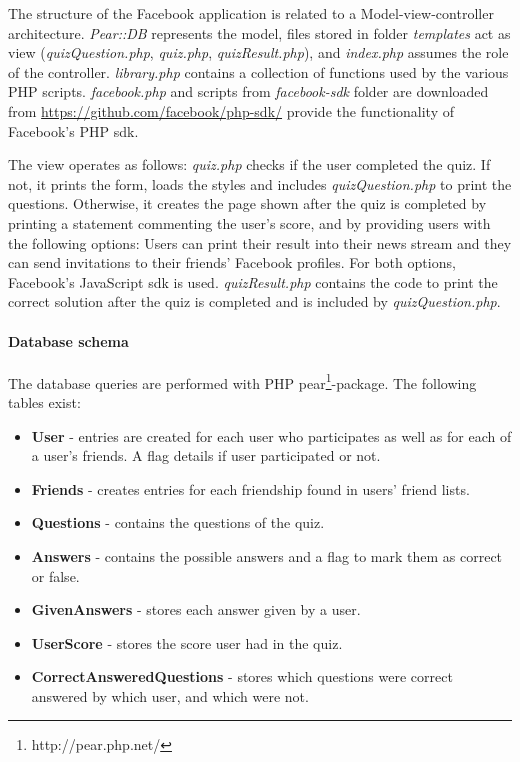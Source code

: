 \documentclass[preprint,12pt]{elsarticle}
\begin{document}
The structure of the Facebook application is related to a
Model-view-controller architecture. \textit{Pear::DB} represents the
model, files stored in folder \textit{templates} act as view
(\textit{quizQuestion.php}, \textit{quiz.php},
\textit{quizResult.php}), and \textit{index.php} assumes the role of
the controller. \textit{library.php} contains a collection of
functions used by the various PHP scripts. \textit{facebook.php} and
scripts from \textit{facebook-sdk} folder are downloaded from
\url{https://github.com/facebook/php-sdk/} provide the functionality
of Facebook's PHP \ac{sdk}.

The view operates as follows: \textit{quiz.php} checks if the user
completed the quiz. If not, it prints the form, loads the styles and
includes \textit{quizQuestion.php} to print the questions. Otherwise, it
creates the page shown after the quiz is completed by printing a
statement commenting the user's score, and by providing users with 
the following options: Users can print their result into their news
stream and they can send invitations to their friends' Facebook
profiles. For both options, Facebook's JavaScript \ac{sdk} is
used. \textit{quizResult.php} contains the code to  
print the correct solution after the quiz is completed and is included
by \textit{quizQuestion.php}. 


\paragraph{Database schema}
\label{sec:database-schema}
The database queries are performed with PHP
pear\footnote{http://pear.php.net/}-package. The following tables exist:
\begin{itemize}
\item \textbf{User} - entries are created for each user who participates as
well as for each of a user's friends. A flag details if user
participated or not.
\item \textbf{Friends} - creates entries for each friendship found in
users' friend lists.
\item \textbf{Questions} - contains the questions of the quiz.
\item \textbf{Answers} - contains the possible answers and a flag to mark them
as correct or false.
\item \textbf{GivenAnswers} - stores each answer given by a user.
\item \textbf{UserScore} - stores the score user had in the quiz.
\item \textbf{CorrectAnsweredQuestions} - stores which questions were correct
answered by which user, and which were not.
\end{itemize}
\end{document}
